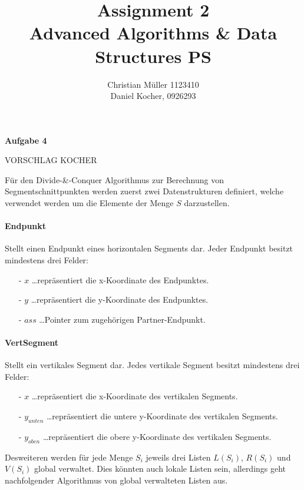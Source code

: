 \documentclass{article}
\begin{document}
%
\title{Assignment 2 \\ Advanced Algorithms \& Data Structures PS}%
\author{Christian Müller 1123410 \\ Daniel Kocher, 0926293}%
\maketitle%
\clearpage%
%
{\noindent\bfseries Aufgabe 4}%

\medskip%

{\noindent\LARGE VORSCHLAG KOCHER}%

\medskip%
\noindent
F{\"u}r den Divide-\&-Conquer Algorithmus zur Berechnung von Segmentschnittpunkten
werden zuerst zwei Datenstrukturen definiert, welche verwendet werden um die
Elemente der Menge $S$ darzustellen.

\paragraph{Endpunkt}
Stellt einen Endpunkt eines horizontalen Segments dar.
Jeder Endpunkt besitzt mindestens drei Felder:
\begin{itemize}
  \item[-] $x$ \ldots repr{\"a}sentiert die x-Koordinate des Endpunktes.
  \item[-] $y$ \ldots repr{\"a}sentiert die y-Koordinate des Endpunktes.
  \item[-] $ass$ \ldots Pointer zum zugeh{\"o}rigen Partner-Endpunkt.
\end{itemize}

\paragraph{VertSegment}
Stellt ein vertikales Segment dar. Jedes vertikale Segment besitzt mindestens
drei Felder:
\begin{itemize}
  \item[-] $x$ \ldots repr{\"a}sentiert die x-Koordinate des vertikalen Segments.
  \item[-] $y_{unten}$ \ldots repr{\"a}sentiert die untere y-Koordinate des
    vertikalen Segments.
  \item[-] $y_{oben}$ \ldots repr{\"a}sentiert die obere y-Koordinate des
    vertikalen Segments.
\end{itemize}
%
Desweiteren werden f{\"u}r jede Menge $S_i$ jeweils drei Listen $L(S_i)$, $R(S_i)$
und $V(S_i)$ global verwaltet. Dies k{\"o}nnten auch lokale Listen sein,
allerdings geht nachfolgender Algorithmus von global verwalteten Listen aus.
\end{document}
